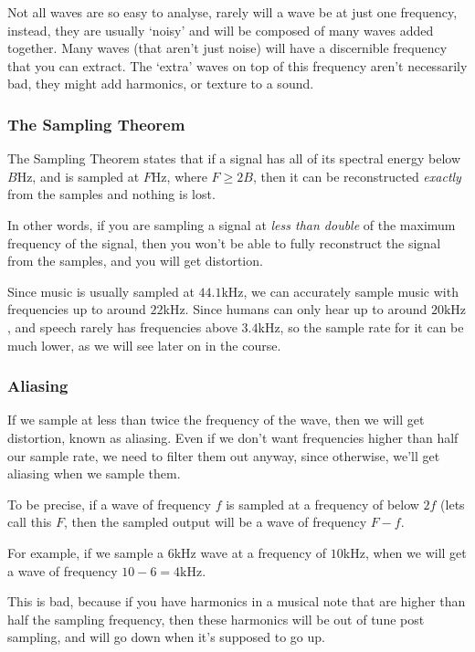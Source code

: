 Not all waves are so easy to analyse, rarely will a wave be at just one
frequency, instead, they are usually `noisy' and will be composed of many waves
added together. Many waves (that aren't just noise) will have a discernible
frequency that you can extract. The `extra' waves on top of this frequency
aren't necessarily bad, they might add harmonics, or texture to a sound.

\subsubsection{The Sampling Theorem}


The Sampling Theorem states that if a signal has all of its spectral energy
below $B$Hz, and is sampled at $F$Hz, where $F \geq 2B$, then it can be
reconstructed \textit{exactly} from the samples and nothing is lost.

In other words, if you are sampling a signal at \textit{less than double} of the
maximum frequency of the signal, then you won't be able to fully reconstruct the
signal from the samples, and you will get distortion.

Since music is usually sampled at $44.1$\si{\kilo\hertz}, we can accurately
sample music with frequencies up to around $22$\si{\kilo\hertz}. Since humans
can only hear up to around $20\si{\kilo\hertz}$, and speech rarely has
frequencies above $3.4$\si{\kilo\hertz}, so the sample rate for it can be much
lower, as we will see later on in the course.

\subsubsection{Aliasing}

If we sample at less than twice the frequency of the wave, then we will get
distortion, known as aliasing. Even if we don't want frequencies higher than
half our sample rate, we need to filter them out anyway, since otherwise, we'll
get aliasing when we sample them.

To be precise, if a wave of frequency $f$ is sampled at a frequency of below
$2f$ (lets call this $F$, then the sampled output will be a wave of frequency $F
- f$.

For example, if we sample a $6\si{\kilo\hertz}$ wave at a frequency of
$10\si{\kilo\hertz}$, when we will get a wave of frequency $10-6 =
4\si{\kilo\hertz}$.

This is bad, because if you have harmonics in a musical note that are higher
than half the sampling frequency, then these harmonics will be out of tune post
sampling, and will go down when it's supposed to go up.

